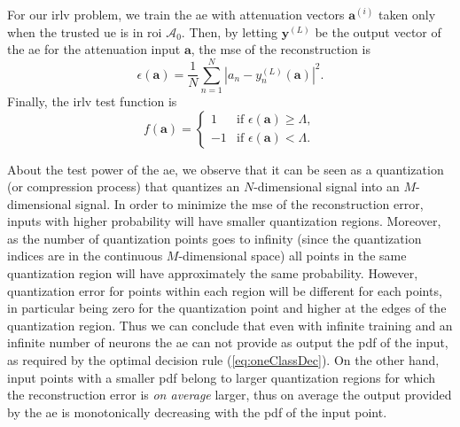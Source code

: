 \documentclass[draftcls,onecolumn,12pt]{IEEEtran}
\begin{document}
For our \ac{irlv} problem, we train the \ac{ae} with attenuation vectors $\bm{a}^{(i)}$ taken only when the trusted \ac{ue} is in  \ac{roi} $\mathcal A_0$. Then, by letting $\bm{y}^{(L)}$ be the output vector of the \ac{ae} for the attenuation input $\bm{a}$, the \ac{mse} of the reconstruction is 
\begin{equation}\label{eq: rec err}
    \epsilon(\bm{a} ) = \frac{1}{N}\sum_{n=1}^{N}|a_n-y^{(L)}_n(\bm{a})|^2.
\end{equation}
Finally, the \ac{irlv} test function  is  
\begin{equation}
f(\bm{a}) =
\begin{cases}
1 &\text{if } \epsilon(\bm{a} ) \geq \Lambda, \\
-1 & \text{if } \epsilon(\bm{a} ) < \Lambda.
\end{cases}
\end{equation}

About the test power of the \ac{ae}, we observe that it can be seen as a quantization (or compression process) that quantizes an $N$-dimensional signal into an $M$-dimensional signal. In order to minimize the \ac{mse} of the reconstruction error, inputs with higher probability will have smaller quantization regions. Moreover, as the number of quantization points goes to infinity (since the quantization indices are in the continuous $M$-dimensional space) all points in the same quantization region will have approximately the same probability. However, quantization error for points within each region will be different for each points, in particular being zero for the quantization point and higher at the edges of the quantization region. Thus we can conclude that even with infinite training and an infinite number of neurons the \ac{ae} can not provide as output the \ac{pdf} of the input, as required by the optimal decision rule (\ref{eq:oneClassDec}). On the other hand, input points with a smaller \ac{pdf} belong to larger quantization regions for which the reconstruction error is {\em on average} larger, thus on average the output provided by the \ac{ae} is monotonically decreasing with the \ac{pdf} of the input point. 
\end{document}
